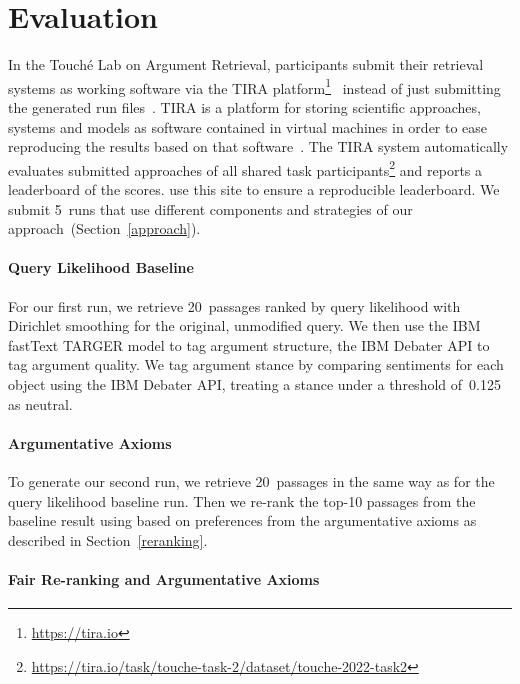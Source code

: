 \section{Evaluation}
\label{evaluation}

In the Touché Lab on Argument Retrieval, participants submit their retrieval systems as working software via the TIRA platform\footnote{\url{https://tira.io}}~\cite{PotthastGWS2019} instead of just submitting the generated run files~\cite{BondarenkoFKSGBPBSWPH2022}.
TIRA is a platform for storing scientific approaches, systems and models as software contained in virtual machines in order to ease reproducing the results based on that software~\cite{PotthastGWS2019}.
The TIRA system automatically evaluates submitted approaches of all shared task participants\footnote{\url{https://tira.io/task/touche-task-2/dataset/touche-2022-task2}} and reports a leaderboard of the  scores.
\citet{BondarenkoFKSGBPBSWPH2022} use this site to ensure a reproducible leaderboard.
We submit 5~runs that use different components and strategies of our approach~(Section~\ref{approach}).

\paragraph{Query Likelihood Baseline}

For our first run, we retrieve 20~passages ranked by query likelihood with Dirichlet smoothing for the original, unmodified query. We then use the IBM fastText TARGER model to tag argument structure,
the IBM Debater API to tag argument quality.
We tag argument stance by comparing sentiments for each object using the IBM Debater API, treating a stance under a threshold of~0.125 as neutral.

\paragraph{Argumentative Axioms}

To generate our second run, we retrieve 20~passages in the same way as for the query likelihood baseline run. Then we re-rank the top-10 passages from the baseline result using \KwikSort based on preferences from the argumentative axioms as described in Section~\ref{reranking}.

\paragraph{Fair Re-ranking and Argumentative Axioms}


